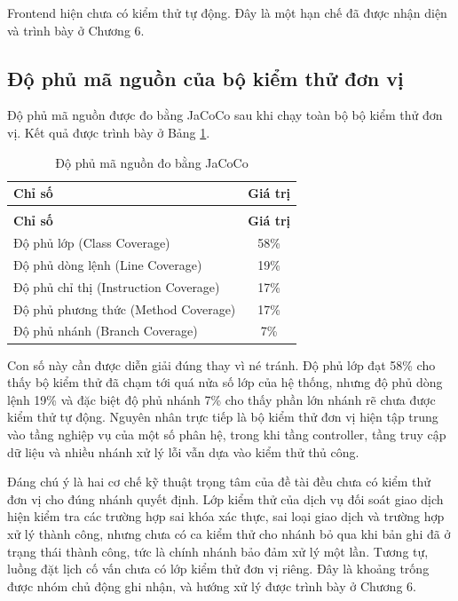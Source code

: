 \documentclass[12pt,a4paper,oneside]{report}
\begin{document}
Frontend hiện chưa có kiểm thử tự động. Đây là một hạn chế đã được nhận diện và trình bày ở Chương 6.

\subsection{Độ phủ mã nguồn của bộ kiểm thử đơn vị}

Độ phủ mã nguồn được đo bằng JaCoCo sau khi chạy toàn bộ bộ kiểm thử đơn vị. Kết quả được trình bày ở Bảng \ref{tab:coverage}.

\renewcommand{\arraystretch}{1.25}
{\small
\begin{longtable}{|>{\raggedright\arraybackslash}p{7.0cm}|c|}
\caption{Độ phủ mã nguồn đo bằng JaCoCo}\label{tab:coverage}\\
\hline \textbf{Chỉ số} & \textbf{Giá trị} \\ \hline
\endfirsthead
\multicolumn{2}{l}{\itshape\small (tiếp theo trang trước)}\\[2pt]
\hline \textbf{Chỉ số} & \textbf{Giá trị} \\ \hline
\endhead
\hline
\endlastfoot
Độ phủ lớp (Class Coverage) & 58\% \\ \hline
Độ phủ dòng lệnh (Line Coverage) & 19\% \\ \hline
Độ phủ chỉ thị (Instruction Coverage) & 17\% \\ \hline
Độ phủ phương thức (Method Coverage) & 17\% \\ \hline
Độ phủ nhánh (Branch Coverage) & 7\% \\ \hline
\end{longtable}
}
\renewcommand{\arraystretch}{1}

Con số này cần được diễn giải đúng thay vì né tránh. Độ phủ lớp đạt 58\% cho thấy bộ kiểm thử đã chạm tới quá nửa số lớp của hệ thống, nhưng độ phủ dòng lệnh 19\% và đặc biệt độ phủ nhánh 7\% cho thấy phần lớn nhánh rẽ chưa được kiểm thử tự động. Nguyên nhân trực tiếp là bộ kiểm thử đơn vị hiện tập trung vào tầng nghiệp vụ của một số phân hệ, trong khi tầng controller, tầng truy cập dữ liệu và nhiều nhánh xử lý lỗi vẫn dựa vào kiểm thử thủ công.

Đáng chú ý là hai cơ chế kỹ thuật trọng tâm của đề tài đều chưa có kiểm thử đơn vị cho đúng nhánh quyết định. Lớp kiểm thử của dịch vụ đối soát giao dịch hiện kiểm tra các trường hợp sai khóa xác thực, sai loại giao dịch và trường hợp xử lý thành công, nhưng chưa có ca kiểm thử cho nhánh bỏ qua khi bản ghi đã ở trạng thái thành công, tức là chính nhánh bảo đảm xử lý một lần. Tương tự, luồng đặt lịch cố vấn chưa có lớp kiểm thử đơn vị riêng. Đây là khoảng trống được nhóm chủ động ghi nhận, và hướng xử lý được trình bày ở Chương 6.
\end{document}
